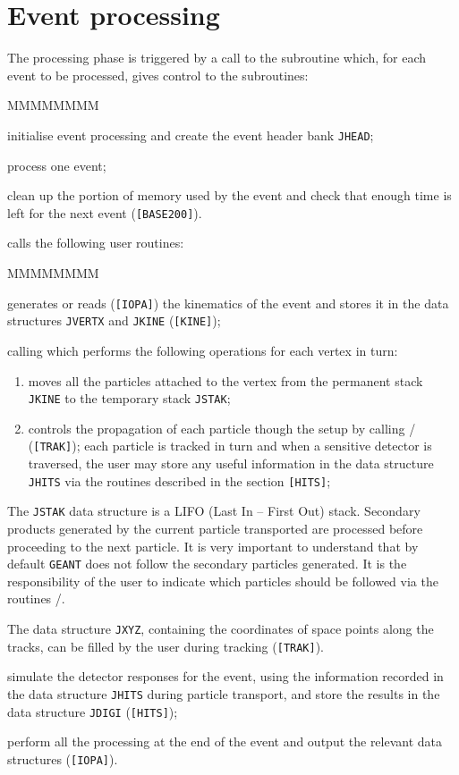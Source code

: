 \section{Event processing}
 
The processing phase is triggered by a call to the subroutine  which,
for each event to be processed, gives control to the subroutines:
 
\begin{DLtt}{MMMMMMMM}
\item[\Rind{GTRIGI}] initialise event processing and create the
event header bank {\tt JHEAD};
\item[\Rind{GTRIG}] process one event;
\item[\Rind{GTRIGC}] clean up the portion of memory used by the event
and check that enough time is left for the next event ({\tt [BASE200]}).
\end{DLtt}
 calls the following user routines:
\begin{DLtt}{MMMMMMMM}
\item[\Rind{GUKINE}]
generates or reads ({\tt [IOPA]})
the kinematics of the event and stores it
in the data structures {\tt JVERTX} and {\tt JKINE} ({\tt [KINE]});

\item[\Rind{GUTREV}]
calling  which performs the following operations for each
vertex in turn:
\begin{enumerate}
\item moves all the particles attached to the vertex from the permanent 
stack {\tt JKINE} to the temporary stack {\tt JSTAK};
\item controls the propagation of each particle though the setup by 
calling / ({\tt [TRAK]}); 
each particle is tracked in turn and when a sensitive detector
is traversed, the user may store
any useful information in the data structure {\tt JHITS} 
via the routines described in the section {\tt [HITS]};
\end{enumerate}
 
The {\tt JSTAK} data structure is a LIFO (Last In -- First Out) stack.
Secondary products generated by the current particle transported
are processed before proceeding to the next particle. 
It is very important to understand that by default {\tt GEANT} does not
follow the secondary particles generated. It is the responsibility of the
user to indicate which particles should be followed via the
routines /.

The data structure {\tt JXYZ}, containing the
coordinates of space points along the tracks,
can be filled by the user during tracking ({\tt [TRAK]}).

\item[\Rind{GUDIGI}]
simulate the detector responses for the event, using 
the information recorded in the data
structure {\tt JHITS} during particle transport, and store
the results in the data structure {\tt JDIGI} ({\tt [HITS]});

\item[\Rind{GUOUT}]
perform all the processing at the end of the event and 
output the relevant data structures ({\tt [IOPA]}).
\end{DLtt}
 
